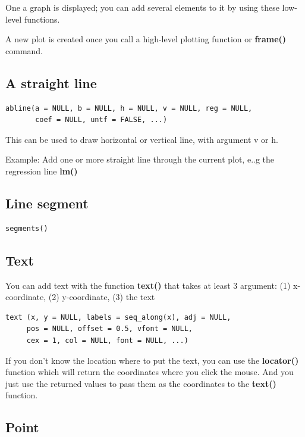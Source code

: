 One a graph is displayed; you can add several elements to it by using
these low-level functions.  

A new plot is created once you call a high-level plotting function or
{\bf frame()} command. 

\subsection{A straight line}
\label{sec:straight-line}

\begin{lstlisting}
abline(a = NULL, b = NULL, h = NULL, v = NULL, reg = NULL,
       coef = NULL, untf = FALSE, ...)
\end{lstlisting}

This can be used to draw horizontal or vertical line, with argument v
or h.

Example: Add one or more straight line through the current plot, e..g
the regression line {\bf lm()}


\subsection{Line segment}
\label{sec:line-segment}

\begin{lstlisting}
segments()
\end{lstlisting}

\subsection{Text}
\label{sec:text}

You can add text with the function {\bf text()} that takes at least 3
argument: (1) x-coordinate, (2) y-coordinate, (3) the text 
\begin{lstlisting}
text (x, y = NULL, labels = seq_along(x), adj = NULL,
     pos = NULL, offset = 0.5, vfont = NULL,
     cex = 1, col = NULL, font = NULL, ...)
\end{lstlisting}
If you don't know the location where to put the text, you can use the
{\bf locator()} function which will return the coordinates where you
click the mouse. And you just use the returned values to pass them as
the coordinates to the {\bf text()} function.


\subsection{Point}
\label{sec:point}

